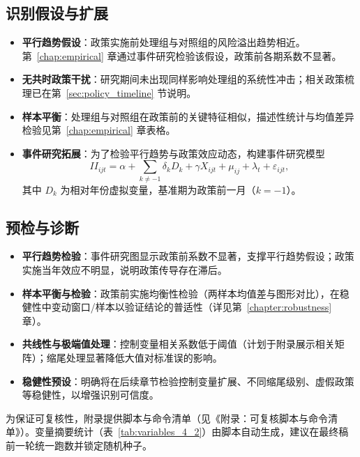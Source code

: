 \subsection{识别假设与扩展}
\begin{itemize}
    \item \textbf{平行趋势假设}：政策实施前处理组与对照组的风险溢出趋势相近。第~\ref{chap:empirical} 章通过事件研究检验该假设，政策前各期系数不显著。
    \item \textbf{无共时政策干扰}：研究期间未出现同样影响处理组的系统性冲击；相关政策梳理已在第~\ref{sec:policy_timeline} 节说明。
    \item \textbf{样本平衡}：处理组与对照组在政策前的关键特征相似，描述性统计与均值差异检验见第~\ref{chap:empirical} 章表格。
    \item \textbf{事件研究拓展}：为了检验平行趋势与政策效应动态，构建事件研究模型
    \begin{equation}
        II_{ijt} = \alpha + \sum_{k \neq -1} \delta_k D_k + \gamma X_{ijt} + \mu_{ij} + \lambda_t + \varepsilon_{ijt},
        \label{eq:event_study}
    \end{equation}
    其中 \(D_k\) 为相对年份虚拟变量，基准期为政策前一月（\(k=-1\)）。
\end{itemize}

\subsection{预检与诊断}
\label{sec:diagnostics}

\begin{itemize}
    \item \textbf{平行趋势检验}：事件研究图显示政策前系数不显著，支撑平行趋势假设；政策实施当年效应不明显，说明政策传导存在滞后。
    \item \textbf{样本平衡与检验}：政策前实施均衡性检验（两样本均值差与图形对比），在稳健性中变动窗口/样本以验证结论的普适性（详见第~\ref{chapter:robustness} 章）。
    \item \textbf{共线性与极端值处理}：控制变量相关系数低于阈值（计划于附录展示相关矩阵）；缩尾处理显著降低大值对标准误的影响。
    \item \textbf{稳健性预设}：明确将在后续章节检验控制变量扩展、不同缩尾级别、虚假政策等稳健性，以增强识别可信度。
\end{itemize}

为保证可复核性，附录提供脚本与命令清单（见《附录：可复核脚本与命令清单》）。变量摘要统计（表~\ref{tab:variables_4_2}）由脚本自动生成，建议在最终稿前一轮统一跑数并锁定随机种子。
